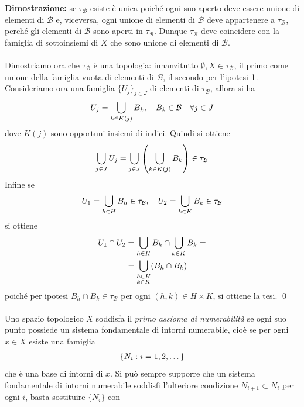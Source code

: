 \documentclass{article}
\begin{document}
\textbf{Dimostrazione:} se $\tau_\mathcal{B}$ esiste è unica poiché ogni suo aperto deve essere unione di elementi di $\mathcal{B}$ e, viceversa, ogni unione di elementi di $\mathcal{B}$ deve appartenere a $\tau_\mathcal{B}$, perché gli elementi di $\mathcal{B}$ sono aperti in $\tau_\mathcal{B}$. Dunque $\tau_\mathcal{B}$ deve coincidere con la famiglia di sottoinsiemi di $X$ che sono unione di elementi di $\mathcal{B}$. \\ \\
Dimostriamo ora che $\tau_\mathcal{B}$ è una topologia: innanzitutto $\emptyset, X \in \tau_\mathcal{B}$, il primo come unione della famiglia vuota di elementi di $\mathcal{B}$, il secondo per l'ipotesi \textbf{1}. Consideriamo ora una famiglia $\{ U_j \}_{j \in J}$ di elementi di $\tau_\mathcal{B}$, allora si ha
\begin{gather}
    U_j = \bigcup_{k \in K(j)} B_k, \quad B_k \in \mathcal{B} \quad \forall j \in J \notag
\end{gather}
dove $K(j)$ sono opportuni insiemi di indici. Quindi si ottiene
\begin{gather}
    \bigcup_{j \in J} U_j = \bigcup_{j \in J} \left( \bigcup_{k \in K(j)} B_k \right) \in \tau_\mathcal{B} \notag
\end{gather}
Infine se
\begin{gather}
    U_1 = \bigcup_{h \in H} B_h \in \tau_\mathcal{B}, \quad U_2 = \bigcup_{k \in K} B_k \in \tau_\mathcal{B} \notag
\end{gather}
si ottiene
\begin{align}
    U_1 \cap U_2 &= \bigcup_{h \in H} B_h \cap \bigcup_{k \in K} B_k = \notag \\
    &= \bigcup_{\substack{h \in H \\ k \in K}} (B_h \cap B_k) \notag
\end{align}
poiché per ipotesi $B_h \cap B_k \in \tau_\mathcal{B}$ per ogni $(h, k) \in H \times K$, si ottiene la tesi. \qed \\ \\
Uno spazio topologico $X$ soddisfa il \textit{primo assioma di numerabilità} se ogni suo punto possiede un sistema fondamentale di intorni numerabile, cioè se per ogni $x \in X$ esiste una famiglia
\begin{gather}
    \{ N_i : i = 1, 2, \dots \} \notag
\end{gather}
che è una base di intorni di $x$. Si può sempre supporre che un sistema fondamentale di intorni numerabile soddisfi l'ulteriore condizione $N_{i + 1} \subset N_i$ per ogni $i$, basta sostituire $\{ N_i \}$ con
\end{document}
